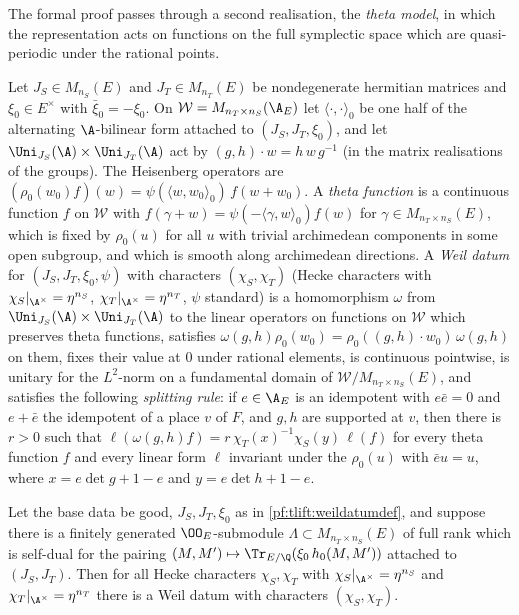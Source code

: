 The formal proof passes through a second realisation, the \emph{theta model}, in which the representation acts on
functions on the full symplectic space which are quasi-periodic under the rational points.

\begin{definition}\label{pf:tlift:weildatumdef}
Let $J_S\in M_{n_S}(E)$ and $J_T\in M_{n_T}(E)$ be nondegenerate hermitian matrices and $\xi_0\in E^\times$ with
$\bar\xi_0=-\xi_0$. On $\mathcal W=M_{n_T\times n_S}(\tliftAE)$ let $\langle\cdot,\cdot\rangle_0$ be one half of the alternating
$\A$-bilinear form attached to $(J_S,J_T,\xi_0)$, and let $\Uni_{J_S}(\A)\times\Uni_{J_T}(\A)$ act by
$(g,h)\cdot w=h\,w\,g^{-1}$ (in the matrix realisations of the groups). The Heisenberg operators are
$(\rho_0(w_0)f)(w)=\psi(\langle w,w_0\rangle_0)\,f(w+w_0)$. A \emph{theta function} is a continuous function $f$ on $\mathcal W$
with $f(\gamma+w)=\psi(-\langle\gamma,w\rangle_0)f(w)$ for $\gamma\in M_{n_T\times n_S}(E)$, which is fixed by $\rho_0(u)$ for all $u$
with trivial archimedean components in some open subgroup, and which is smooth along archimedean directions. A
\emph{Weil datum} for $(J_S,J_T,\xi_0,\psi)$ with characters $(\chi_S,\chi_T)$ (Hecke characters with
$\chi_S|_{\A^\times}=\eta^{n_S}$, $\chi_T|_{\A^\times}=\eta^{n_T}$, $\psi$ standard) is a homomorphism $\omega$ from
$\Uni_{J_S}(\A)\times\Uni_{J_T}(\A)$ to the linear operators on functions on $\mathcal W$ which preserves theta
functions, satisfies $\omega(g,h)\rho_0(w_0)=\rho_0((g,h)\cdot w_0)\,\omega(g,h)$ on them, fixes their value at $0$
under rational elements, is continuous pointwise, is unitary for the $L^2$-norm on a fundamental domain of
$\mathcal W/M_{n_T\times n_S}(E)$, and satisfies the following \emph{splitting rule}: if $e\in\tliftAE$ is an idempotent with
$e\bar e=0$ and $e+\bar e$ the idempotent of a place $v$ of $F$, and $g,h$ are supported at $v$, then there is $r>0$
such that $\ell(\omega(g,h)f)=r\,\chi_T(x)^{-1}\chi_S(y)\,\ell(f)$ for every theta function $f$ and every linear form $\ell$
invariant under the $\rho_0(u)$ with $\bar e u=u$, where $x=e\det g+1-e$ and $y=e\det h+1-e$.
\end{definition}

\begin{proposition}\label{pf:tlift:weildatum}
Let the base data be good, $J_S,J_T,\xi_0$ as in \cref{pf:tlift:weildatumdef}, and suppose there is a finitely
generated $\OO_E$-submodule $\Lambda\subset M_{n_T\times n_S}(E)$ of full rank which is self-dual for the pairing
$(M,M')\mapsto\Tr_{E/\Q}(\xi_0\,h_0(M,M'))$ attached to $(J_S,J_T)$. Then for all Hecke characters $\chi_S,\chi_T$ with
$\chi_S|_{\A^\times}=\eta^{n_S}$ and $\chi_T|_{\A^\times}=\eta^{n_T}$ there is a Weil datum with characters $(\chi_S,\chi_T)$.
\end{proposition}

